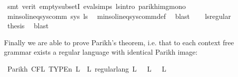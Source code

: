 \begin{isabellebody}
\ {\isacharparenleft}{\kern0pt}smt\ {\isacharparenleft}{\kern0pt}verit{\isacharparenright}{\kern0pt}\ empty{\isacharunderscore}{\kern0pt}subsetI\ eval{\isachardot}{\kern0pt}simps{\isacharparenleft}{\kern0pt}{}{\isacharparenright}{\kern0pt}\ ls{\isacharprime}{\kern0pt}{\isacharunderscore}{\kern0pt}intro\ parikh{\isacharunderscore}{\kern0pt}img{\isacharunderscore}{\kern0pt}mono{\isacharparenright}{\kern0pt}\isanewline
\ \ \isamarkupfalse%
\isanewline
\ \ \isamarkupfalse%
\ \isamarkupfalse%
\ {\isachardoublequoteopen}min{\isacharunderscore}{\kern0pt}sol{\isacharunderscore}{\kern0pt}ineq{\isacharunderscore}{\kern0pt}sys{\isacharunderscore}{\kern0pt}comm\ sys\ {\isacharquery}{\kern0pt}ls{\isacharprime}{\kern0pt}{\isachardoublequoteclose}\ \isamarkupfalse%
\ min{\isacharunderscore}{\kern0pt}sol{\isacharunderscore}{\kern0pt}ineq{\isacharunderscore}{\kern0pt}sys{\isacharunderscore}{\kern0pt}comm{\isacharunderscore}{\kern0pt}def\ \isamarkupfalse%
\ blast\isanewline
\ \ \isamarkupfalse%
\ ls{\isacharprime}{\kern0pt}{\isacharunderscore}{\kern0pt}regular\ \isamarkupfalse%
\ {\isacharquery}{\kern0pt}thesis\ \isamarkupfalse%
\ blast\isanewline
{}\isamarkupfalse%
%
\endisatagproof
{\isafoldproof}%
%
\isadelimproof
%
\endisadelimproof
%
\isadelimdocument
%
\endisadelimdocument
%
\isatagdocument
%
\isamarkuptrue%
%
\endisatagdocument
{\isafolddocument}%
%
\isadelimdocument
%
\endisadelimdocument
%
\begin{isamarkuptext}%
Finally we are able to prove Parikh's theorem, i.e. that to each context free grammar exists
a regular language with identical Parikh image:%
\end{isamarkuptext}\isamarkuptrue%
\isamarkupfalse%
\ Parikh{\isacharcolon}{\kern0pt}\ {\isachardoublequoteopen}CFL\ {\isacharparenleft}{\kern0pt}TYPE{\isacharparenleft}{\kern0pt}{\isacharprime}{\kern0pt}n{\isacharparenright}{\kern0pt}{\isacharparenright}{\kern0pt}\ L\ {\isasymLongrightarrow}\ {\isasymexists}L{\isacharprime}{\kern0pt}{\isachardot}{\kern0pt}\ regular{\isacharunderscore}{\kern0pt}lang\ L{\isacharprime}{\kern0pt}\ {\isasymand}\ {\isasymPsi}\ L\ {\isacharequal}{\kern0pt}\ {\isasymPsi}\ L{\isacharprime}{\kern0pt}{\isachardoublequoteclose}\isanewline
%
\isadelimproof
%
\endisadelimproof
%
\isatagproof
{}\isamarkupfalse%
\ {\isacharminus}{\kern0pt}\isanewline

\end{isabellebody}
